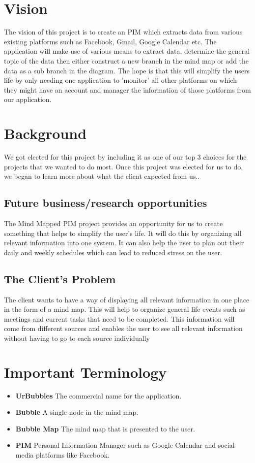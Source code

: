 \documentclass[hidelinks,english]{article}
\begin{document}
	
	\section{Vision}
	The vision of this project is to create an PIM which extracts data from various existing platforms such as Facebook, Gmail, Google Calendar etc. The application will make use of various means to extract data, determine the general topic of the data then either construct a new branch in the mind map or add the data as a sub branch in the diagram. The hope is that this will simplify the users life by only needing one application to 'monitor' all other platforms on which they might have an account and manager the information of those platforms from our application.
	
	\section{Background}
		We got elected for this project by including it as one of our top 3 choices for the projects that we wanted to do most. Once this project was elected for us to do, we began to learn more about what the client expected from us..

		\subsection{Future business/research opportunities}
		The Mind Mapped PIM project provides an opportunity for us to create something that helps to simplify the user's life. It will do this by organizing all relevant information into one system. It can also help the user to plan out their daily and weekly schedules which can lead to reduced stress on the user.
		
		\subsection{The Client's Problem}
		The client wants to have a way of displaying all relevant information in one place in the form of a mind map. This will help to organize general life events such as meetings and current tasks that need to be completed. This information will come from different sources and enables the user to see all relevant information without having to go to each source individually
		
	\section{Important Terminology}
		\begin{itemize}
			\item \textbf{UrBubbles} The commercial name for the application.
			\item \textbf{Bubble} A single node in the mind map.
			\item \textbf{Bubble Map} The mind map that is presented to the user.
			\item \textbf{PIM} Personal Information Manager such as Google Calendar and social media platforms like Facebook.
		\end{itemize}	
	
\end{document}
